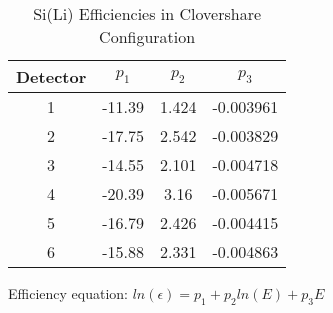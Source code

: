 \begin{table}[]
    \centering
    \caption{Si(Li) Efficiencies in Clovershare Configuration}
    \label{tab:sili_eff_clover}
    \begin{threeparttable}
    \begin{tabular}{c|c|c|c}
    \toprule
        Detector & $p_1$ & $p_2$ & $p_3$ \\
        \hline
        1	&	-11.39	&	1.424	&	-0.003961	\\
        2	&	-17.75	&	2.542	&	-0.003829	\\
        3	&	-14.55	&	2.101	&	-0.004718	\\
        4	&	-20.39	&	3.16	&	-0.005671	\\
        5	&	-16.79	&	2.426	&	-0.004415	\\
        6	&	-15.88	&	2.331	&	-0.004863	\\
        \bottomrule
    \end{tabular}
    \begin{tablenotes}[para]
        Efficiency equation: $ln(\epsilon) = p_1+p_2ln(E)+p_3E$
    \end{tablenotes}
\end{threeparttable}
\end{table}